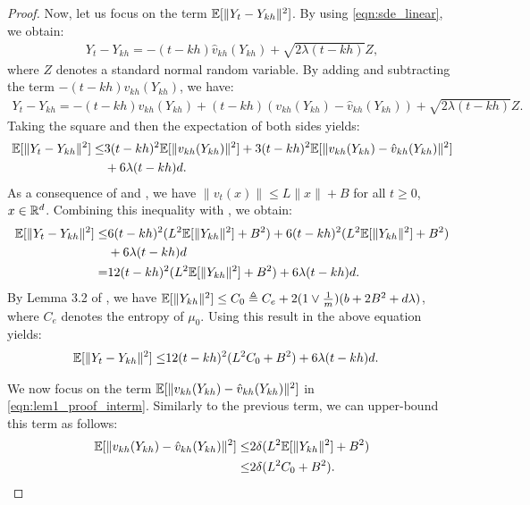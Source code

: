 \begin{proof}
Now, let us focus on the term $\mathbb{E}[ \|Y_t - Y_{kh} \|^2]$. By using \eqref{eqn:sde_linear}, we obtain:
\begin{align}
Y_t - Y_{kh} = - (t-kh) \hat{v}_{kh}(Y_{kh}) + \sqrt{2 \lambda (t-kh)} Z,
\end{align}
where $Z$ denotes a standard normal random variable. By adding and subtracting the term $-(t-kh) v_{kh}(Y_{kh})$, we have:
\begin{align}
Y_t - Y_{kh} = -(t-kh)v_{kh}(Y_{kh}) + (t-kh)(v_{kh}(Y_{kh}) - \hat{v}_{kh}(Y_{kh})) + \sqrt{2 \lambda (t-kh)} Z.
\end{align}
Taking the square and then the expectation of both sides yields:
\begin{align}
\nonumber \mathbb{E}[ \|Y_t - Y_{kh} \|^2] \leq& 3(t-kh)^2 \mathbb{E}[ \|v_{kh}(Y_{kh})\|^2] + 3 (t-kh)^2 \mathbb{E}[\|v_{kh}(Y_{kh}) - \hat{v}_{kh}(Y_{kh})\|^2] \\
&+ 6\lambda (t-kh)d.
\end{align}
As a consequence of  and , we have $\| v_t(x)\| \leq L\|x\|+B$ for all $t \geq 0$, $x\in \mathbb{R}^d$. Combining this inequality with , we obtain:
\begin{align}
\nonumber \mathbb{E}[ \|Y_t - Y_{kh} \|^2] \leq& 6(t-kh)^2 (L^2 \mathbb{E}[ \|Y_{kh}\|^2] + B^2) + 6(t-kh)^2 (L^2 \mathbb{E}[ \|Y_{kh}\|^2] + B^2) \\
&+ 6\lambda (t-kh)d\\
=& 12(t-kh)^2 (L^2 \mathbb{E}[ \|Y_{kh}\|^2] + B^2) + 6\lambda (t-kh)d.
\end{align}
By Lemma 3.2 of \cite{raginsky17a}, we have $\mathbb{E}[ \|Y_{kh}\|^2] \leq C_0 \triangleq C_e +2  (1 \vee \frac1{m})(b+2B^2 + d \lambda)$, where $C_e$ denotes the entropy of $\mu_0$. Using this result in the above equation yields:
\begin{align}
\mathbb{E}[ \|Y_t - Y_{kh} \|^2] \leq& 12(t-kh)^2 (L^2 C_0 + B^2) + 6\lambda (t-kh)d. \label{eqn:lem_bound1}
\end{align}

We now focus on the term $\mathbb{E}[ \|v_{kh}(Y_{kh}) - \hat{v}_{kh}(Y_{kh}) \|^2 ]$ in \eqref{eqn:lem1_proof_interm}. Similarly to the previous term, we can upper-bound this term as follows:
\begin{align}
\mathbb{E}[ \|v_{kh}(Y_{kh}) - \hat{v}_{kh}(Y_{kh}) \|^2 ] \leq& 2 \delta(L^2 \mathbb{E}[\|Y_{kh}\|^2] + B^2) \\
\leq& 2 \delta(L^2 C_0 + B^2). \label{eqn:lem_bound2}
\end{align}


\end{proof}
